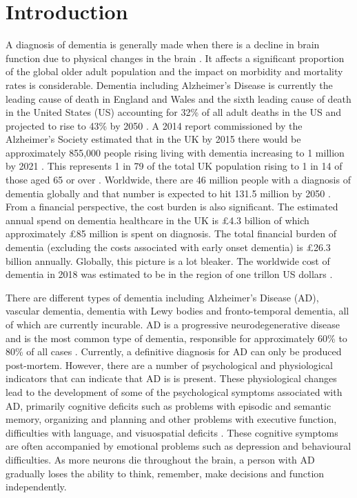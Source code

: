 \documentclass[12pt]{article}
\begin{document}
\section{Introduction}\label{introduction}
A diagnosis of dementia is generally made when there is a decline in brain function due to physical changes in the brain \cite{Albert2011}. It affects a significant proportion of the global older adult population and the impact on morbidity and mortality rates is considerable. Dementia including Alzheimer's Disease is currently the leading cause of death in England and Wales \cite{Patel2018} and the sixth leading cause of death in the United States (US) accounting for 32\% of all adult deaths in the US and projected to rise to 43\% by 2050 \cite{Weuve2014} . A 2014 report commissioned by the Alzheimer's Society estimated that in the UK by 2015 there would be approximately 855,000 people rising living with dementia increasing to 1 million by 2021 \cite{AlzheimersSociety2014}. This represents 1 in 79 of the total UK population rising to 1 in 14 of those aged 65 or over \cite{AlzheimersSociety2014}. Worldwide, there are 46 million people with a diagnosis of dementia globally and that number is expected to hit 131.5 million by 2050 \cite{Prince2015}. From a financial perspective, the cost burden is also significant. The estimated annual spend on dementia healthcare in the UK is £4.3 billion of which approximately £85 million is spent on diagnosis. The total financial burden of dementia (excluding the costs associated with early onset dementia) is £26.3 billion annually. Globally, this picture is a lot bleaker. The worldwide cost of dementia in 2018 was estimated to be in the region of one trillon US dollars \cite{Prince2015}.
\par 
There are different types of dementia including Alzheimer's Disease (AD), vascular dementia, dementia with Lewy bodies and fronto-temporal dementia, all of which are currently incurable. AD is a progressive neurodegenerative disease and is the most common type of dementia, responsible for approximately 60\% to 80\% of all cases \cite{Duong2017}. Currently, a definitive diagnosis for AD can only be produced post-mortem. However, there are a number of psychological and physiological indicators that can indicate that AD is is present. These physiological changes lead to the development of some of the psychological symptoms associated with AD, primarily cognitive deficits such as problems with episodic and semantic memory, organizing and planning and other problems with executive function, difficulties with language, and visuospatial deficits \cite{McKhann2011}. These cognitive symptoms are often accompanied by emotional problems such as depression and behavioural difficulties. As more neurons die throughout the brain, a person with AD gradually loses the ability to think, remember, make decisions and function independently.
\end{document}

